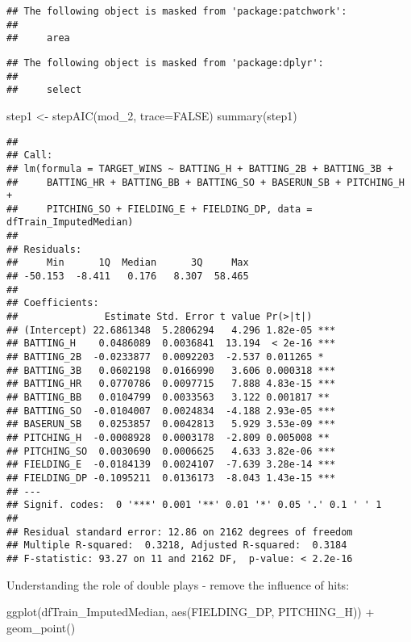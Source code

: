 \documentclass[
]{article}
\newenvironment{Shaded}{\begin{snugshade}}{\end{snugshade}}
\newcommand{\AttributeTok}[1]{\textcolor[rgb]{0.77,0.63,0.00}{#1}}
\newcommand{\ConstantTok}[1]{\textcolor[rgb]{0.00,0.00,0.00}{#1}}
\newcommand{\FunctionTok}[1]{\textcolor[rgb]{0.00,0.00,0.00}{#1}}
\newcommand{\NormalTok}[1]{#1}
\newcommand{\OtherTok}[1]{\textcolor[rgb]{0.56,0.35,0.01}{#1}}
\newcommand{\SpecialCharTok}[1]{\textcolor[rgb]{0.00,0.00,0.00}{#1}}
\begin{document}
\begin{verbatim}
## The following object is masked from 'package:patchwork':
## 
##     area
\end{verbatim}

\begin{verbatim}
## The following object is masked from 'package:dplyr':
## 
##     select
\end{verbatim}

\begin{Shaded}
\begin{Highlighting}[]
\NormalTok{step1 }\OtherTok{\textless{}{-}} \FunctionTok{stepAIC}\NormalTok{(mod\_2, }\AttributeTok{trace=}\ConstantTok{FALSE}\NormalTok{)}
\FunctionTok{summary}\NormalTok{(step1)}
\end{Highlighting}
\end{Shaded}

\begin{verbatim}
## 
## Call:
## lm(formula = TARGET_WINS ~ BATTING_H + BATTING_2B + BATTING_3B + 
##     BATTING_HR + BATTING_BB + BATTING_SO + BASERUN_SB + PITCHING_H + 
##     PITCHING_SO + FIELDING_E + FIELDING_DP, data = dfTrain_ImputedMedian)
## 
## Residuals:
##     Min      1Q  Median      3Q     Max 
## -50.153  -8.411   0.176   8.307  58.465 
## 
## Coefficients:
##               Estimate Std. Error t value Pr(>|t|)    
## (Intercept) 22.6861348  5.2806294   4.296 1.82e-05 ***
## BATTING_H    0.0486089  0.0036841  13.194  < 2e-16 ***
## BATTING_2B  -0.0233877  0.0092203  -2.537 0.011265 *  
## BATTING_3B   0.0602198  0.0166990   3.606 0.000318 ***
## BATTING_HR   0.0770786  0.0097715   7.888 4.83e-15 ***
## BATTING_BB   0.0104799  0.0033563   3.122 0.001817 ** 
## BATTING_SO  -0.0104007  0.0024834  -4.188 2.93e-05 ***
## BASERUN_SB   0.0253857  0.0042813   5.929 3.53e-09 ***
## PITCHING_H  -0.0008928  0.0003178  -2.809 0.005008 ** 
## PITCHING_SO  0.0030690  0.0006625   4.633 3.82e-06 ***
## FIELDING_E  -0.0184139  0.0024107  -7.639 3.28e-14 ***
## FIELDING_DP -0.1095211  0.0136173  -8.043 1.43e-15 ***
## ---
## Signif. codes:  0 '***' 0.001 '**' 0.01 '*' 0.05 '.' 0.1 ' ' 1
## 
## Residual standard error: 12.86 on 2162 degrees of freedom
## Multiple R-squared:  0.3218, Adjusted R-squared:  0.3184 
## F-statistic: 93.27 on 11 and 2162 DF,  p-value: < 2.2e-16
\end{verbatim}

Understanding the role of double plays - remove the influence of hits:

\begin{Shaded}
\begin{Highlighting}[]
\FunctionTok{ggplot}\NormalTok{(dfTrain\_ImputedMedian, }\FunctionTok{aes}\NormalTok{(FIELDING\_DP, PITCHING\_H)) }\SpecialCharTok{+}
  \FunctionTok{geom\_point}\NormalTok{()}
\end{Highlighting}
\end{Shaded}
\end{document}
